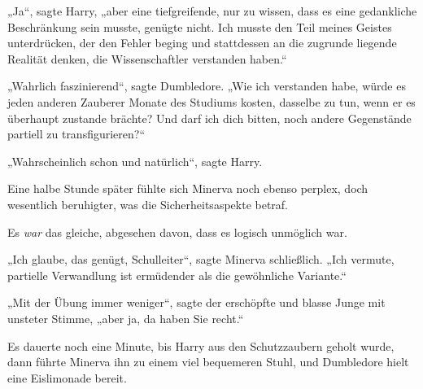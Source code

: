 „Ja“, sagte Harry, „aber eine tiefgreifende, nur zu wissen, dass es eine gedankliche Beschränkung sein musste, genügte nicht. Ich musste den Teil meines Geistes unterdrücken, der den Fehler beging und stattdessen an die zugrunde liegende Realität denken, die Wissenschaftler verstanden haben.“

„Wahrlich faszinierend“, sagte Dumbledore.
„Wie ich verstanden habe, würde es jeden anderen Zauberer Monate des Studiums kosten, dasselbe zu tun, wenn er es überhaupt zustande brächte? Und darf ich dich bitten, noch andere Gegenstände partiell zu transfigurieren?“

„Wahrscheinlich schon und natürlich“, sagte Harry.

Eine halbe Stunde später fühlte sich Minerva noch ebenso perplex, doch wesentlich beruhigter, was die Sicherheitsaspekte betraf.

Es \emph{war} das gleiche, abgesehen davon, dass es logisch unmöglich war.

„Ich glaube, das genügt, Schulleiter“, sagte Minerva schließlich.
„Ich vermute, partielle Verwandlung ist ermüdender als die gewöhnliche Variante.“

„Mit der Übung immer weniger“, sagte der erschöpfte und blasse Junge mit unsteter Stimme, „aber ja, da haben Sie recht.“

Es dauerte noch eine Minute, bis Harry aus den Schutzzaubern geholt wurde, dann führte Minerva ihn zu einem viel bequemeren Stuhl, und Dumbledore hielt eine Eislimonade bereit.

